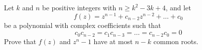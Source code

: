 Let \(k\) and \(n\) be positive integers with \(n\geq k^2-3k+4\), and let
\[f(z)=z^{n-1}+c_{n-2}z^{n-2}+\dots+c_0\]be a polynomial with complex coefficients such that
\[c_0c_{n-2}=c_1c_{n-3}=\dots=c_{n-2}c_0=0\]Prove that \(f(z)\) and \(z^n-1\) have at most \(n-k\) common roots.